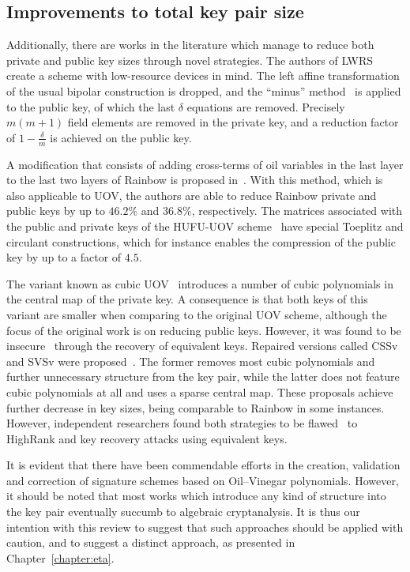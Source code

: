 \documentclass[draft, 12pt, a4paper, oneside]{memoir}
\theoremstyle{definition}
\theoremstyle{remark}
\begin{document}
\subsection{Improvements to total key pair size}\label{subsec:both}

Additionally, there are works in the literature which manage to reduce both private and public key sizes through novel strategies. The authors of LWRS~\cite{Zhang:201208} create a scheme with low-resource devices in mind. The left affine transformation of the usual bipolar construction is dropped, and the ``minus'' method~\cite[Subsection 3.2.1]{Wolf:200511} is applied to the public key, of which the last $\delta$ equations are removed. Precisely $m (m + 1)$ field elements are removed in the private key, and a reduction factor of $1 - \frac{\delta}{m}$ is achieved on the public key. 

A modification that consists of adding cross-terms of oil variables in the last layer to the last two layers of Rainbow is proposed in~\cite{Tan:201603}. With this method, which is also applicable to UOV, the authors are able to reduce Rainbow private and public keys by up to $46.2\%$ and $36.8\%$, respectively. The matrices associated with the public and private keys of the HUFU-UOV scheme~\cite{Tao:201905} have special Toeplitz and circulant constructions, which for instance enables the compression of the public key by up to a factor of $4.5$.

The variant known as cubic UOV~\cite{Nie:201511} introduces a number of cubic polynomials in the central map of the private key. A consequence is that both keys of this variant are smaller when comparing to the original UOV scheme, although the focus of the original work is on reducing public keys. However, it was found to be insecure~\cite{Hashimoto:201712} through the recovery of equivalent keys. Repaired versions called CSSv and SVSv were proposed~\cite{Duong:201611}. The former removes most cubic polynomials and further unnecessary structure from the key pair, while the latter does not feature cubic polynomials at all and uses a sparse central map. These proposals achieve further decrease in key sizes, being comparable to Rainbow in some instances. However, independent researchers found both strategies to be flawed~\cite{Shim:201711,Hashimoto:201712} to HighRank and key recovery attacks using equivalent keys.

It is evident that there have been commendable efforts in the creation, validation and correction of signature schemes based on Oil--Vinegar polynomials. However, it should be noted that most works which introduce any kind of structure into the key pair eventually succumb to algebraic cryptanalysis. It is thus our intention with this review to suggest that such approaches should be applied with caution, and to suggest a distinct approach, as presented in Chapter~\ref{chapter:eta}.
\end{document}
